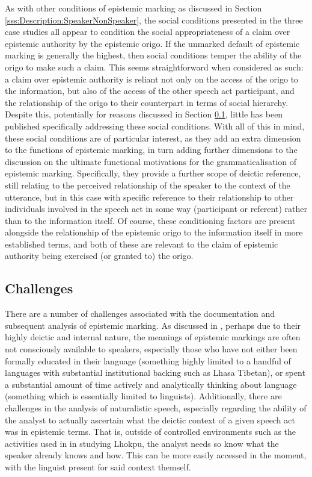 As with other conditions of epistemic marking as discussed in Section \ref{sss:Description:SpeakerNonSpeaker}, the social conditions presented in the three case studies all appear to condition the social appropriateness of a claim over epistemic authority by the epistemic origo. If the unmarked default of epistemic marking is generally the highest, then social conditions temper the ability of the origo to make such a claim. This seems straightforward when considered as such: a claim over epistemic authority is reliant not only on the access of the origo to the information, but also of the access of the other speech act participant, and the relationship of the origo to their counterpart in terms of social hierarchy. Despite this, potentially for reasons discussed in Section \ref{ss:Discussion:SocialChallenges}, little has been published specifically addressing these social conditions. With all of this in mind, these social conditions are of particular interest, as they add an extra dimension to the functions of epistemic marking, in turn adding further dimensions to the discussion on the ultimate functional motivations for the grammaticalisation of epistemic marking. Specifically, they provide a further scope of deictic reference, still relating to the perceived relationship of the speaker to the context of the utterance, but in this case with specific reference to their relationship to other individuals involved in the speech act in some way (participant or referent) rather than to the information itself. Of course, these conditioning factors are present alongside the relationship of the epistemic origo to the information itself in more established terms, and both of these are relevant to the claim of epistemic authority being exercised (or granted to) the origo.

\subsection{Challenges}\label{ss:Discussion:SocialChallenges}
There are a number of challenges associated with the documentation and subsequent analysis of epistemic marking. As discussed in , perhaps due to their highly deictic and internal nature, the meanings of epistemic markings are often not consciously available to speakers, especially those who have not either been formally educated in their language (something highly limited to a handful of languages with substantial institutional backing such as Lhasa Tibetan), or spent a substantial amount of time actively and analytically thinking about language (something which is essentially limited to linguists). Additionally, there are challenges in the analysis of naturalistic speech, especially regarding the ability of the analyst to actually ascertain what the deictic context of a given speech act was in epistemic terms. That is, outside of controlled environments such as the activities used in  in studying Lhokpu, the analyst needs so know what the speaker already knows and how. This can be more easily accessed in the moment, with the linguist present for said context themself.

